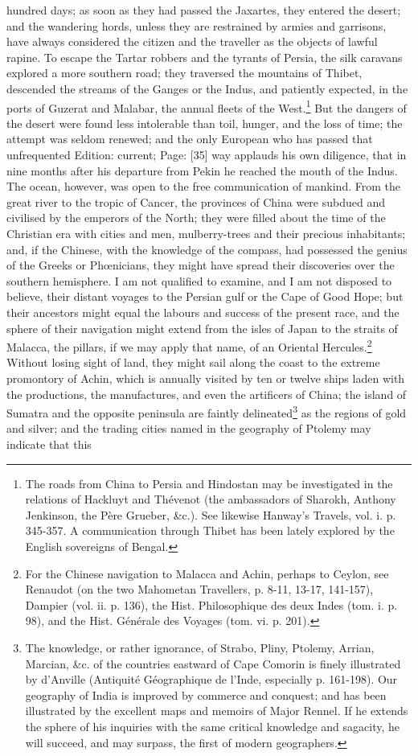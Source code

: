 hundred days; as soon as they had passed the Jaxartes, they entered the desert; and the wandering hords, unless they are restrained by armies and garrisons, have always considered the citizen and the traveller as the objects of lawful rapine. To escape the Tartar robbers and the tyrants of Persia, the silk caravans explored a more southern road; they traversed the mountains of Thibet, descended the streams of the Ganges or the Indus, and patiently expected, in the ports of Guzerat and Malabar, the annual fleets of the West.\footnote{The roads from China to Persia and Hindostan may be investigated in the relations of Hackluyt and Thévenot (the ambassadors of Sharokh, Anthony Jenkinson, the Père Grueber, \&c.). See likewise Hanway\texthebrew{}’s Travels, vol. i. p. 345-357. A communication through Thibet has been lately explored by the English sovereigns of Bengal.} But the dangers of the desert were found less intolerable than toil, hunger, and the loss of time; the attempt was seldom renewed; and the only European who has passed that unfrequented Edition: current; Page: [35] way applauds his own diligence, that in nine months after his departure from Pekin he reached the mouth of the Indus. The ocean, however, was open to the free communication of mankind. From the great river to the tropic of Cancer, the provinces of China were subdued and civilised by the emperors of the North; they were filled about the time of the Christian era with cities and men, mulberry-trees and their precious inhabitants; and, if the Chinese, with the knowledge of the compass, had possessed the genius of the Greeks or Phœnicians, they might have spread their discoveries over the southern hemisphere. I am not qualified to examine, and I am not disposed to believe, their distant voyages to the Persian gulf or the Cape of Good Hope; but their ancestors might equal the labours and success of the present race, and the sphere of their navigation might extend from the isles of Japan to the straits of Malacca, the pillars, if we may apply that name, of an Oriental Hercules.\footnote{For the Chinese navigation to Malacca and Achin, perhaps to Ceylon, see Renaudot (on the two Mahometan Travellers, p. 8-11, 13-17, 141-157), Dampier (vol. ii. p. 136), the Hist. Philosophique des deux Indes (tom. i. p. 98), and the Hist. Générale des Voyages (tom. vi. p. 201).} Without losing sight of land, they might sail along the coast to the extreme promontory of Achin, which is annually visited by ten or twelve ships laden with the productions, the manufactures, and even the artificers of China; the island of Sumatra and the opposite peninsula are faintly delineated\footnote{The knowledge, or rather ignorance, of Strabo, Pliny, Ptolemy, Arrian, Marcian, \&c. of the countries eastward of Cape Comorin is finely illustrated by d\texthebrew{}’Anville (Antiquité Géographique de l\texthebrew{}’Inde, especially p. 161-198). Our geography of India is improved by commerce and conquest; and has been illustrated by the excellent maps and memoirs of Major Rennel. If he extends the sphere of his inquiries with the same critical knowledge and sagacity, he will succeed, and may surpass, the first of modern geographers.} as the regions of gold and silver; and the trading cities named in the geography of Ptolemy may indicate that this 